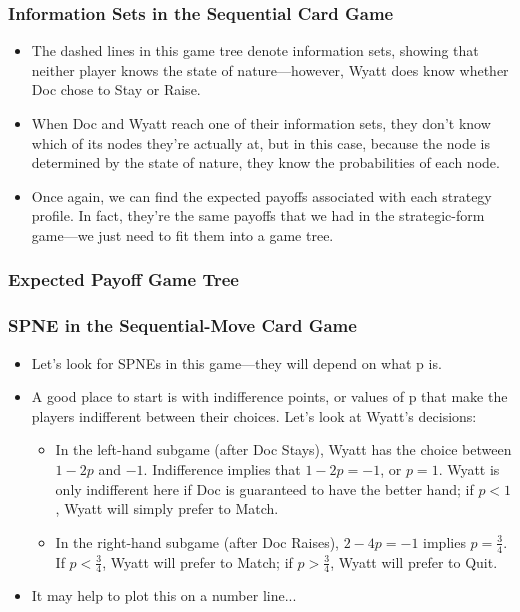 \begin{frame}
\frametitle{Information Sets in the Sequential Card Game}
\begin{itemize}
\item The dashed lines in this game tree denote information sets, showing that neither player knows the state of nature---however, Wyatt does know whether Doc chose to Stay or Raise.
\item When Doc and Wyatt reach one of their information sets, they don't know which of its nodes they're actually at, but in this case, because the node is determined by the state of nature, they know the probabilities of each node.
\item Once again, we can find the expected payoffs associated with each strategy profile. In fact, they're the same payoffs that we had in the strategic-form game---we just need to fit them into a game tree.
\end{itemize}
\end{frame}

\begin{frame}
\frametitle{Expected Payoff Game Tree}
\end{frame}

\begin{frame}
\frametitle{SPNE in the Sequential-Move Card Game}
\begin{itemize}
	\item Let's look for SPNEs in this game---they will depend on what p is.
	\item A good place to start is with \alert{indifference points}, or values of p that make the players indifferent between their choices. Let's look at Wyatt's decisions:
	\begin{itemize}
		\item In the left-hand subgame (after Doc Stays), Wyatt has the choice between $1 - 2p$ and $-1$. Indifference implies that $1 - 2p = -1$, or $p = 1$. Wyatt is only indifferent here if Doc is guaranteed to have the better hand; if $p < 1$, Wyatt will simply prefer to Match.
		\item In the right-hand subgame (after Doc Raises), $2 - 4p = -1$ implies $p = \frac{3}{4}$. If $p < \frac{3}{4}$, Wyatt will prefer to Match; if $p > \frac{3}{4}$, Wyatt will prefer to Quit.
	\end{itemize}
	\item It may help to plot this on a number line...
\end{itemize}
\end{frame}

